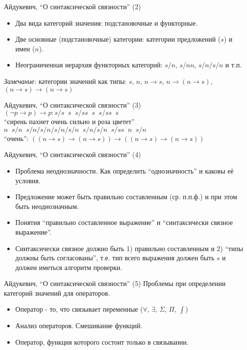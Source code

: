 \documentclass{beamer}
\begin{document}
\begin{frame}{Айдукевич, ``О синтаксической связности'' (2)}
\begin{itemize}
  \item Два вида категорий значения: подстановочные и функторные.
  \item Две основные (подстановочные) категории: категории предложений ($s$) и имен ($n$).
  \item Неограниченная иерархия функторных категорий: $s/n$, $s/nn$, $s/n/s/n$  и т.п.
\end{itemize}
\bigskip
\textit{Замечание:} категории значений как типы: $s$, $n$, $n \to s$, $n \to (n \to s)$, $(n \to s) \to (n \to s)$
\end{frame}

\begin{frame}{Айдукевич, ``О синтаксической связности'' (3)}
$(\neg p \to p) \to p : s/s \;\; s \;\; s/ss \;\; s \;\; s/ss \;\; s$\\
\bigskip
``сирень пахнет очень сильно и роза цветет''\\$n \;\; s/n \;\; s/n/s/n/s/n/s/n \;\; s/n/s/n \;\; s/ss \;\; n \;\; s/n$\\
\bigskip
``очень'': $((n \to s) \to (n \to s)) \to ((n \to s) \to (n \to s))$
\end{frame}

\begin{frame}{Айдукевич, ``О синтаксической связности'' (4)}
\begin{itemize}
  \item Проблема неоднозначности. Как определить ``однозначность'' и каковы её условия.
  \item Предложение может быть правильно составленным (ср. п.п.ф.) и при этом быть неоднозначным.
  \item Понятия ``правильно составленное выражение'' и ``синтаксически связное выражение''.
  \item Синтаксически связное должно быть 1) правильно составленным и 2) ``типы должны быть согласованы'', т.е. тип всего выражения должен быть $s$ и должен иметься алгоритм проверки.
\end{itemize}
\end{frame}

\begin{frame}{Айдукевич, ``О синтаксической связности'' (5)}
Проблемы при определении категорий значений для операторов.\\
\bigskip
\begin{itemize}
  \item Оператор - то, что связывает переменные ($\forall$, $\exists$, $\Sigma$, $\Pi$, $\int$)
  \item Анализ операторов. Смешивание функций. 
  \item Оператор, функция которого состоит только в связывании.
\end{itemize}
\end{frame}
\end{document}
